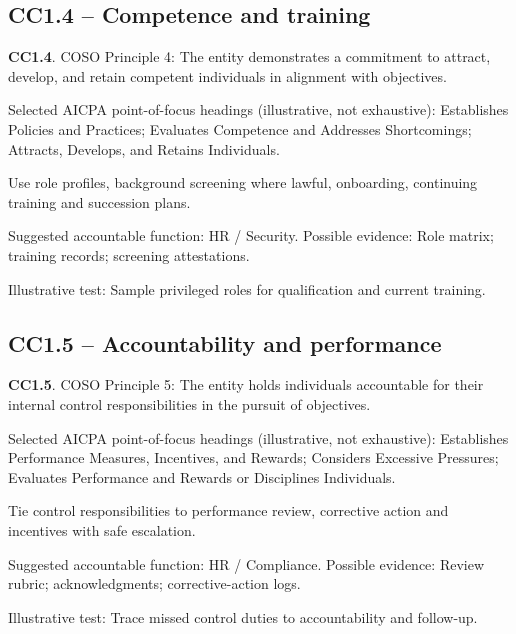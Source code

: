 \documentclass[10pt,oneside]{report}
\begin{document}
\subsection*{CC1.4 -- Competence and training}
\begin{aicpabox}
\textbf{CC1.4}. COSO Principle 4: The entity demonstrates a commitment to attract, develop, and retain competent individuals in alignment with objectives.\par{}
\end{aicpabox}
Selected AICPA point-of-focus headings (illustrative, not exhaustive): Establishes Policies and Practices; Evaluates Competence and Addresses Shortcomings; Attracts, Develops, and Retains Individuals.

\begin{engineeringbox}
Use role profiles, background screening where lawful, onboarding, continuing training and succession plans.
\end{engineeringbox}
Suggested accountable function: HR / Security. Possible evidence: Role matrix; training records; screening attestations.

Illustrative test: Sample privileged roles for qualification and current training.

\subsection*{CC1.5 -- Accountability and performance}
\begin{aicpabox}
\textbf{CC1.5}. COSO Principle 5: The entity holds individuals accountable for their internal control responsibilities in the pursuit of objectives.\par{}
\end{aicpabox}
Selected AICPA point-of-focus headings (illustrative, not exhaustive): Establishes Performance Measures, Incentives, and Rewards; Considers Excessive Pressures; Evaluates Performance and Rewards or Disciplines Individuals.

\begin{engineeringbox}
Tie control responsibilities to performance review, corrective action and incentives with safe escalation.
\end{engineeringbox}
Suggested accountable function: HR / Compliance. Possible evidence: Review rubric; acknowledgments; corrective-action logs.

Illustrative test: Trace missed control duties to accountability and follow-up.
\end{document}
